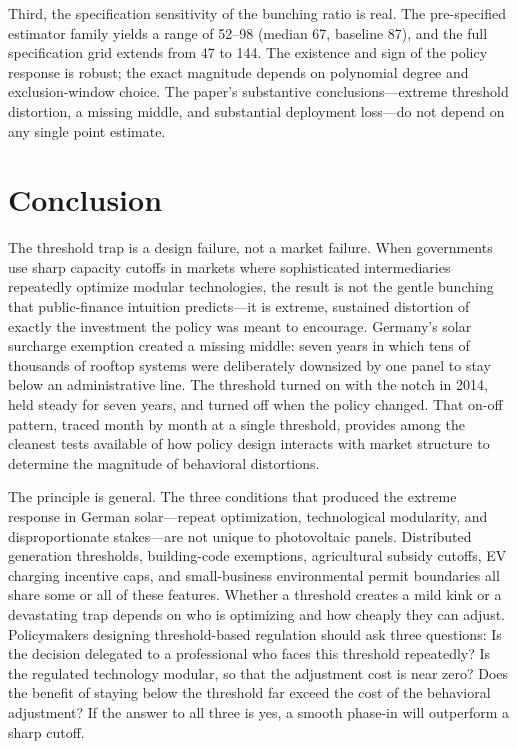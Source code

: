 \documentclass[12pt]{article}
\begin{document}
Third, the specification sensitivity of the bunching ratio is real. The pre-specified estimator family yields a range of 52--98 (median 67, baseline 87), and the full specification grid extends from 47 to 144. The existence and sign of the policy response is robust; the exact magnitude depends on polynomial degree and exclusion-window choice. The paper's substantive conclusions---extreme threshold distortion, a missing middle, and substantial deployment loss---do not depend on any single point estimate.




\section{Conclusion}
\label{sec:conclusion}

The threshold trap is a design failure, not a market failure. When governments use sharp capacity cutoffs in markets where sophisticated intermediaries repeatedly optimize modular technologies, the result is not the gentle bunching that public-finance intuition predicts---it is extreme, sustained distortion of exactly the investment the policy was meant to encourage. Germany's solar surcharge exemption created a missing middle: seven years in which tens of thousands of rooftop systems were deliberately downsized by one panel to stay below an administrative line. The threshold turned on with the notch in 2014, held steady for seven years, and turned off when the policy changed. That on-off pattern, traced month by month at a single threshold, provides among the cleanest tests available of how policy design interacts with market structure to determine the magnitude of behavioral distortions.

The principle is general. The three conditions that produced the extreme response in German solar---repeat optimization, technological modularity, and disproportionate stakes---are not unique to photovoltaic panels. Distributed generation thresholds, building-code exemptions, agricultural subsidy cutoffs, EV charging incentive caps, and small-business environmental permit boundaries all share some or all of these features. Whether a threshold creates a mild kink or a devastating trap depends on who is optimizing and how cheaply they can adjust. Policymakers designing threshold-based regulation should ask three questions: Is the decision delegated to a professional who faces this threshold repeatedly? Is the regulated technology modular, so that the adjustment cost is near zero? Does the benefit of staying below the threshold far exceed the cost of the behavioral adjustment? If the answer to all three is yes, a smooth phase-in will outperform a sharp cutoff.
\end{document}
